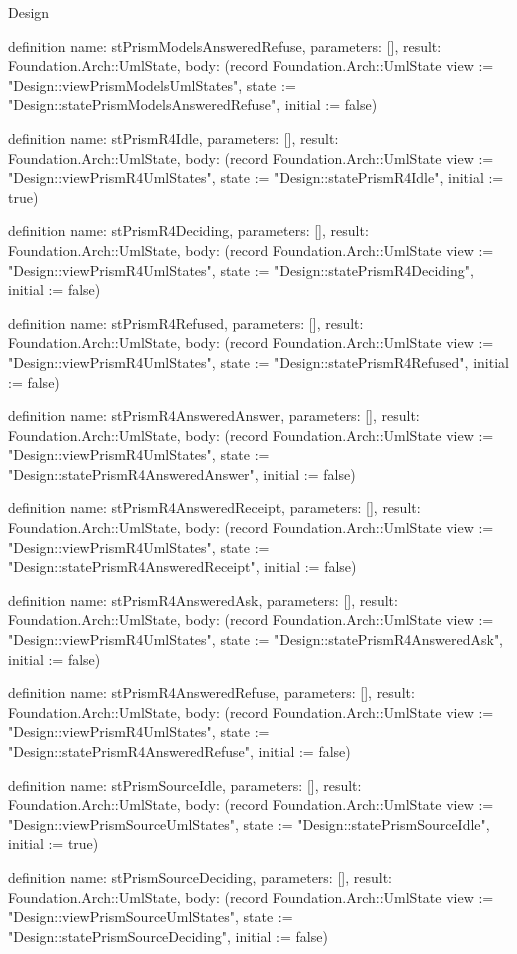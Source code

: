 \begin{lexlean}{Design}
\begin{semanticmodule}
definition{
  name: stPrismModelsAnsweredRefuse,
  parameters: [],
  result: Foundation.Arch::UmlState,
  body: (record Foundation.Arch::UmlState {view := "Design::viewPrismModelsUmlStates", state := "Design::statePrismModelsAnsweredRefuse", initial := false})
}

definition{
  name: stPrismR4Idle,
  parameters: [],
  result: Foundation.Arch::UmlState,
  body: (record Foundation.Arch::UmlState {view := "Design::viewPrismR4UmlStates", state := "Design::statePrismR4Idle", initial := true})
}

definition{
  name: stPrismR4Deciding,
  parameters: [],
  result: Foundation.Arch::UmlState,
  body: (record Foundation.Arch::UmlState {view := "Design::viewPrismR4UmlStates", state := "Design::statePrismR4Deciding", initial := false})
}

definition{
  name: stPrismR4Refused,
  parameters: [],
  result: Foundation.Arch::UmlState,
  body: (record Foundation.Arch::UmlState {view := "Design::viewPrismR4UmlStates", state := "Design::statePrismR4Refused", initial := false})
}

definition{
  name: stPrismR4AnsweredAnswer,
  parameters: [],
  result: Foundation.Arch::UmlState,
  body: (record Foundation.Arch::UmlState {view := "Design::viewPrismR4UmlStates", state := "Design::statePrismR4AnsweredAnswer", initial := false})
}

definition{
  name: stPrismR4AnsweredReceipt,
  parameters: [],
  result: Foundation.Arch::UmlState,
  body: (record Foundation.Arch::UmlState {view := "Design::viewPrismR4UmlStates", state := "Design::statePrismR4AnsweredReceipt", initial := false})
}

definition{
  name: stPrismR4AnsweredAsk,
  parameters: [],
  result: Foundation.Arch::UmlState,
  body: (record Foundation.Arch::UmlState {view := "Design::viewPrismR4UmlStates", state := "Design::statePrismR4AnsweredAsk", initial := false})
}

definition{
  name: stPrismR4AnsweredRefuse,
  parameters: [],
  result: Foundation.Arch::UmlState,
  body: (record Foundation.Arch::UmlState {view := "Design::viewPrismR4UmlStates", state := "Design::statePrismR4AnsweredRefuse", initial := false})
}

definition{
  name: stPrismSourceIdle,
  parameters: [],
  result: Foundation.Arch::UmlState,
  body: (record Foundation.Arch::UmlState {view := "Design::viewPrismSourceUmlStates", state := "Design::statePrismSourceIdle", initial := true})
}

definition{
  name: stPrismSourceDeciding,
  parameters: [],
  result: Foundation.Arch::UmlState,
  body: (record Foundation.Arch::UmlState {view := "Design::viewPrismSourceUmlStates", state := "Design::statePrismSourceDeciding", initial := false})
}


\end{semanticmodule}
\end{lexlean}
